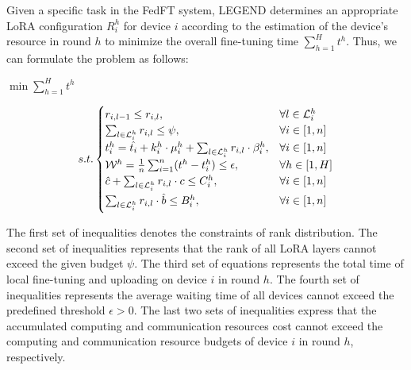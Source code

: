 Given a specific task in the FedFT system, LEGEND determines an appropriate LoRA configuration $R_i^h$ for device $i$ according to the estimation of the device's resource in round $h$ to minimize the overall fine-tuning time $\sum_{h = 1}^H t^h$. 
Thus, we can formulate the problem as follows:

\centerline{$\min \sum\limits_{h=1}^{H} t^h$}
\vspace{-0.5cm}
\begin{equation}\label{problem}
    s.t.
    \begin{cases}
    r_{i,l - 1} \leq r_{i,l}, & \forall l \in \mathcal{L}_i^h\\
    \sum_{l \in \mathcal{L}_i^h} r_{i,l} \leq \psi, & \forall i \in [1, n] \\
    t_i^h =  \hat{t_i} + k_i^h \cdot \mu_{i}^h + \sum_{l \in \mathcal{L}_i^h} r_{i,l} \cdot \beta_i^h, & \forall i \in [1, n]\\
    \mathcal{W}^h = \frac{1}{n} \sum_{i=1}^n (t^h - t_i^h) \leq \epsilon, & \forall h \in [1, H]\\
    \hat{c} + \sum_{l \in \mathcal{L}_i^h} r_{i,l} \cdot c \leq C_i^h, & \forall i \in [1, n] \vspace{0.5ex} \\
    \sum_{l \in \mathcal{L}_i^h} r_{i,l} \cdot \hat{b} \leq B_i^h, & \forall i \in [1,n] \vspace{0.5ex} \\
    \end{cases}
    \vspace{-0.1cm}
\end{equation}
\vspace{-0.4cm}


The first set of inequalities denotes the constraints of rank distribution.
The second set of inequalities represents that the rank of all LoRA layers cannot exceed the given budget $\psi$. 
The third set of equations represents the total time of local fine-tuning and uploading on device $i$ in round $h$.
The fourth set of inequalities represents the average waiting time of all devices cannot exceed the predefined threshold $\epsilon > 0$.
The last two sets of inequalities express that the accumulated computing and communication resources cost cannot exceed the computing and communication resource budgets of device $i$ in round $h$, respectively.


